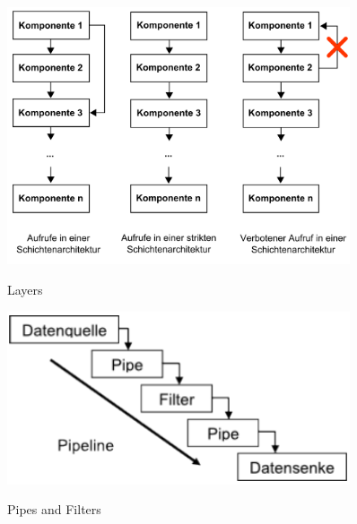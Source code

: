 \begin{figure}[htb]
	\centering
	\begin{minipage}[t]{0.45\linewidth}
		\centering
		\includegraphics[width=0.9\textwidth]{images/layers}
		\label{fig:layers}
		\caption{Layers}
	\end{minipage}%
	\hfill
	\begin{minipage}[t]{0.45\linewidth}
		\centering
		\includegraphics[width=0.9\textwidth]{images/pipes_filters}
		\label{fig:pipes_filters}
		\caption{Pipes and Filters}
	\end{minipage}
\end{figure}

